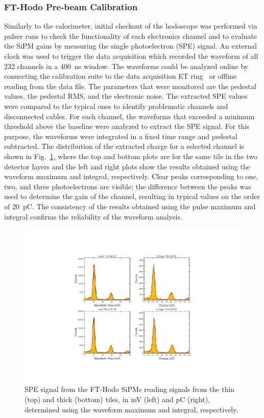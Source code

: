 \subsubsection{FT-Hodo Pre-beam Calibration}

Similarly to the calorimeter, initial checkout of the hodoscope was performed via pulser runs to check the functionality
of each electronics channel and to evaluate the SiPM gains by measuring the single photoelectron (SPE) signal. An external
clock was used to trigger the data acquisition which recorded the waveform of all 232 channels in a 400~ns window.
The waveforms could be analyzed online by connecting the calibration suite to the data acquisition ET ring~\cite{daq}
or offline reading from the data file. The parameters that were monitored are the pedestal values, the pedestal RMS,
and the electronic noise. The extracted SPE values were compared to the typical ones to identify problematic channels
and disconnected cables. For each channel, the waveforms that exceeded a minimum threshold above the baseline were
analyzed to extract the SPE signal. For this purpose, the waveforms were integrated in a fixed time range and pedestal
subtracted. The distribution of the extracted charge for a selected channel is shown in Fig.~\ref{fig:fthodo_spe}, where
the top and bottom plots are for the same tile in the two detector layers and the left and right plots show the results
obtained using the waveform maximum and integral, respectively. Clear peaks corresponding to one, two, and three
photoelectrons are visible; the difference between the peaks was used to determine the gain of the channel, resulting in
typical values on the order of 20~pC. The consistency of the results obtained using the pulse maximum and integral
confirms the reliability of the waveform analysis.

\begin{figure}
\includegraphics[width=1.0\columnwidth]{fig/fthodo_spe_2.pdf}
\caption{SPE signal from the FT-Hodo SiPMs reading signals from the thin (top) and thick (bottom) tiles, in mV
  (left) and pC (right), determined using the waveform maximum and integral, respectively.}
\label{fig:fthodo_spe}
\end{figure}


